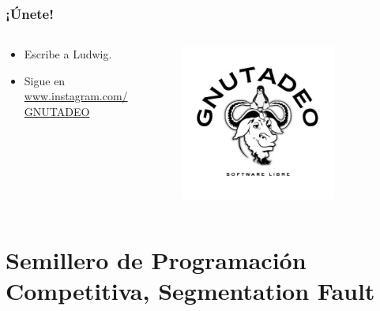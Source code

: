 \documentclass[17pt, t, lualatex]{beamer}
\begin{document}
\begin{frame}
  \frametitle{¡Únete!}
  \begin{columns}
    \begin{column}{.5\textwidth}
      \begin{itemize}
        \item Escribe a Ludwig.
        \item Sigue en \url{www.instagram.com/GNUTADEO}
      \end{itemize}
    \end{column}

    \begin{column}{.5\textwidth}
      \begin{figure}
        \centering
        \includegraphics[width=0.8\textwidth]{img/GNUTADEO.jpg}
      \end{figure}
    \end{column}
  \end{columns}
\end{frame}


\section{Semillero de Programación Competitiva, Segmentation Fault}

\insertsectionpage
\end{document}
